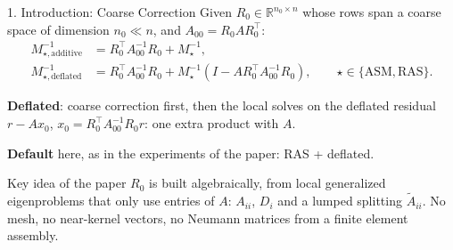 \documentclass[aspectratio=169,10pt]{beamer}
\newcommand{\R}{\mathbb{R}}
\newcommand{\At}{\widetilde{A}}
\begin{document}
\begin{frame}{1. Introduction: Coarse Correction}
  \small
  \setlength{\parskip}{4pt}
  Given $R_0\in\R^{n_0\times n}$ whose rows span a coarse space of dimension $n_0\ll n$, and $A_{00}=R_0AR_0^\top$:
  \begin{align*}
    M^{-1}_{\star,\mathrm{additive}} &= R_0^\top A_{00}^{-1}R_0 + M^{-1}_{\star},\\[2pt]
    M^{-1}_{\star,\mathrm{deflated}} &= R_0^\top A_{00}^{-1}R_0 + M^{-1}_{\star}\left(I-AR_0^\top A_{00}^{-1}R_0\right),
    \qquad \star\in\{\mathrm{ASM},\mathrm{RAS}\}.
  \end{align*}

  \textbf{\color{schwarz}Deflated}: coarse correction first, then the local solves on the \alert{deflated residual}
  $r-Ax_0$, $x_0=R_0^\top A_{00}^{-1}R_0r$: one extra product with $A$.

  \textbf{\color{schwarz}Default} here, as in the experiments of the paper: \alert{RAS + deflated}.

  \vspace{2mm}
  \begin{block}{Key idea of the paper}
    $R_0$ is built \alert{algebraically}, from local generalized eigenproblems that only use entries of $A$:
    $A_{ii}$, $D_i$ and a lumped splitting $\At_{ii}$. No mesh, no near-kernel vectors, no Neumann matrices
    from a finite element assembly.
  \end{block}
\end{frame}
\end{document}
